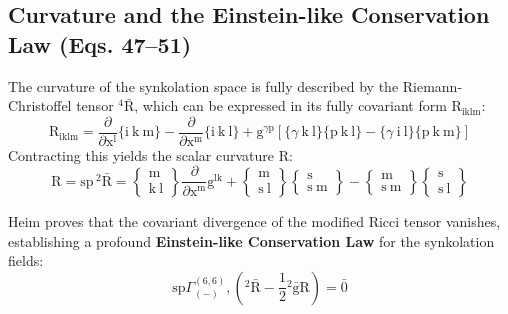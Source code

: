 \documentclass[12pt]{article}
\begin{document}
\subsection{Curvature and the Einstein-like Conservation Law (Eqs. 47--51)}
\label{sec:field_curvature_conservation}

The curvature of the synkolation space is fully described by the Riemann-Christoffel tensor ${}^4\bar{\mathrm{R}}$, which can be expressed in its fully covariant form $\mathrm{R}_{\mathrm{iklm}}$:
\begin{equation}
\mathrm{R}_{\mathrm{iklm}} = \frac{\partial}{\partial \mathrm{x^l}}\{ \mathrm{i} \ \mathrm{k} \ \mathrm{m} \} - \frac{\partial}{\partial \mathrm{x^m}}\{ \mathrm{i} \ \mathrm{k} \ \mathrm{l} \} + \mathrm{g}^{\gamma\mathrm{p}} \left[ \{ \gamma \ \mathrm{k} \ \mathrm{l} \}\{ \mathrm{p} \ \mathrm{k} \ \mathrm{l} \} - \{ \gamma \ \mathrm{i} \ \mathrm{l} \}\{ \mathrm{p} \ \mathrm{k} \ \mathrm{m} \} \right] \tag{48a}
\end{equation}
Contracting this yields the scalar curvature $\mathrm{R}$:
\begin{equation}
\mathrm{R} = \mathrm{sp} \, {}^2\bar{\mathrm{R}} = \left\{ \begin{smallmatrix} \mathrm{m} \\ \mathrm{k} \ \mathrm{l} \end{smallmatrix} \right\}\frac{\partial}{\partial \mathrm{x^m}} \mathrm{g}^{\mathrm{lk}} + \left\{ \begin{smallmatrix} \mathrm{m} \\ \mathrm{s} \ \mathrm{l} \end{smallmatrix} \right\}\left\{ \begin{smallmatrix} \mathrm{s} \\ \mathrm{s} \ \mathrm{m} \end{smallmatrix} \right\} - \left\{ \begin{smallmatrix} \mathrm{m} \\ \mathrm{s} \ \mathrm{m} \end{smallmatrix} \right\}\left\{ \begin{smallmatrix} \mathrm{s} \\ \mathrm{s} \ \mathrm{l} \end{smallmatrix} \right\} \tag{48c}
\end{equation}

Heim proves that the covariant divergence of the modified Ricci tensor vanishes, establishing a profound \textbf{Einstein-like Conservation Law} for the synkolation fields:
\begin{equation}
\mathrm{sp} \Gamma^{(6,6)}_{(-)}, \left( {}^2\bar{\mathrm{R}} - \frac{1}{2}{}^2\bar{\mathrm{g}}\mathrm{R} \right) = \bar{0} \tag{49}
\label{eq:field_einstein_cons}
\end{equation}
\end{document}
